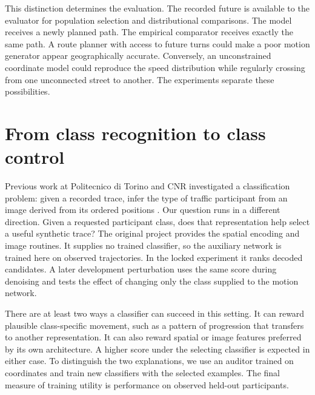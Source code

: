 This distinction determines the evaluation. The recorded future is available to the evaluator for population selection and distributional comparisons. The model receives a newly planned path. The empirical comparator receives exactly the same path. A route planner with access to future turns could make a poor motion generator appear geographically accurate. Conversely, an unconstrained coordinate model could reproduce the speed distribution while regularly crossing from one unconnected street to another. The experiments separate these possibilities.

\section{From class recognition to class control}
Previous work at Politecnico di Torino and CNR investigated a classification problem: given a recorded trace, infer the type of traffic participant from an image derived from its ordered positions \cite{salvadori,ferreira}. Our question runs in a different direction. Given a requested participant class, does that representation help select a useful synthetic trace? The original project provides the spatial encoding and image routines. It supplies no trained classifier, so the auxiliary network is trained here on observed trajectories. In the locked experiment it ranks decoded candidates. A later development perturbation uses the same score during denoising and tests the effect of changing only the class supplied to the motion network.

There are at least two ways a classifier can succeed in this setting. It can reward plausible class-specific movement, such as a pattern of progression that transfers to another representation. It can also reward spatial or image features preferred by its own architecture. A higher score under the selecting classifier is expected in either case. To distinguish the two explanations, we use an auditor trained on coordinates and train new classifiers with the selected examples. The final measure of training utility is performance on observed held-out participants.

